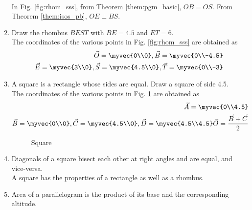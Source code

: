 \begin{enumerate}[label=\arabic*.,ref=\thesubsection.\theenumi]
\\
\solution 	In Fig. \ref{fig:rhom_sss}, 	from Theorem \ref{them:pgm_basic}, $OB = OS$.
From Theorem \ref{them:isos_pb}, $OE \perp BS$.
%
\item Draw the rhombus $BEST$ with $BE = 4.5$ and $ET = 6$. 
\\
\solution The coordinates of the various points in Fig. \ref{fig:rhom_sss} are obtained as
%
\begin{align}
\vec{O} = \myvec{0\\0},
\vec{B} = \myvec{0\\-4.5}
\\
\vec{E} = \myvec{3\\0},
\vec{S} = \myvec{4.5\\0},
\vec{T} = \myvec{0\\-3}
\end{align}
%
\item A square is a rectangle whose sides are equal.  Draw a square of side 4.5.
\\
\solution The coordinates of the various points in Fig. \ref{fig:square} are obtained as
%
\begin{align}
\vec{A} = \myvec{0\\4.5}
\\
\vec{B} = \myvec{0\\0},
\vec{C} = \myvec{4.5\\0},
\vec{D} = \myvec{4.5\\4.5}
\vec{O} = \frac{\vec{B}+\vec{C}}{2}
%
\end{align}
%
\begin{figure}[!ht]
	\begin{center}
		\resizebox{\columnwidth}{!}{}
	\end{center}
	\caption{Square}
	\label{fig:square}	
\end{figure}

\item  Diagonals of a square bisect each other at right angles and are equal, and vice-versa. 
%
\\
\solution A square has the properties of a rectangle as well as a rhombus.
%
%
\item Area of a parallelogram is the product of its base and the corresponding altitude. 
%
\end{enumerate}
